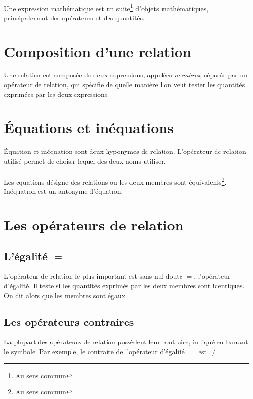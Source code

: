 \documentclass[a4paper]{book}
\begin{document}
    \paragraph{}
    Une expression mathématique est un suite\footnote{Au sens commun} d'objets mathématiques, principalement des opérateurs et des quantités.
    \section{Composition d'une relation}
    \paragraph{}
    Une relation est composée de deux expressions, appelées \emph{membres}, séparés par un opérateur de relation, qui spécifie de quelle manière l'on veut tester les quantités exprimées par les deux expressions.
    \section{Équations et inéquations}
    \paragraph{}
    Équation et inéquation sont deux hyponymes de relation. L'opérateur de relation utilisé permet de choisir lequel des deux noms utiliser.
    \paragraph{}
    Les équations désigne des relations ou les deux membres sont équivalents\footnote{Au sens commun}. Inéquation est un antonyme d'équation.
    \section{Les opérateurs de relation}
    \subsection{L'égalité $=$}
    L'opérateur de relation le plus important est sans nul doute $=$, l'opérateur d'égalité. Il teste si les quantités exprimés par les deux membres sont identiques. On dit alors que les membres sont égaux.
    \subsection{Les opérateurs contraires}
    La plupart des opérateurs de relation possèdent leur contraire, indiqué en barrant le symbole. Par exemple, le contraire de l'opérateur d'égalité $=$ est $\not=$
\end{document}
